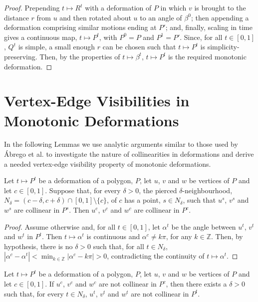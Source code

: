\documentclass{amsart}
\newcommand{\Z}[0]{\mathds{Z}}
\begin{document}
\begin{proof}
  Prepending $t\mapsto R^t$ with a deformation of $P$ in which $v$ is
  brought to the distance $r$ from $u$ and then rotated about $u$ to
  an angle of $\beta^0$; then appending a deformation comprising
  similar motions ending at $P'$; and, finally, scaling in time gives
  a continuous map, $t\mapsto P^t$, with $P^0 = P$ and $P^1 = P'$.
  Since, for all $t\in[0,1]$, $Q^t$ is simple, a small enough $r$ can
  be chosen such that $t\mapsto P^t$ is simplicity-preserving.  Then,
  by the properties of $t\mapsto \beta^t$, $t\mapsto P^t$ is the
  required monotonic deformation.
\end{proof}


\iffullversion

\section{Vertex-Edge Visibilities in Monotonic Deformations}

In the following Lemmas we use analytic arguments similar to those
used by {\'A}brego et al. \cite{Abrego11} to investigate the nature of
collinearities in deformations and derive a needed vertex-edge
visibility property of monotonic deformations.

\begin{lemma}
  Let $t\mapsto P^t$ be a deformation of a polygon, $P$, let $u$, $v$
  and $w$ be vertices of $P$ and let $c\in[0,1]$.  Suppose that, for
  every $\delta>0$, the pierced $\delta$-neighbourhood, $N_\delta =
  (c-\delta, c+\delta)\cap [0,1]\setminus \{c\}$, of $c$ has a point,
  $s\in N_\delta$, such that $u^s$, $v^s$ and $w^s$ are collinear in
  $P^s$.  Then $u^c$, $v^c$ and $w^c$ are collinear in $P^c$.
\end{lemma}
\begin{proof}
  Assume otherwise and, for all $t\in[0,1]$, let $\alpha^t$ be the
  angle between $u^t$, $v^t$ and $w^t$ in $P^t$.  Then $t\mapsto
  \alpha^t$ is continuous and $\alpha^c\neq k\pi$, for any $k\in\Z$.
  Then, by hypothesis, there is no $\delta>0$ such that, for all $t\in
  N_\delta$, $|\alpha^c - \alpha^t| < \min_{k\in\Z}|\alpha^c-k\pi| >
  0$, contradicting the continuity of $t\mapsto \alpha^t$.
\end{proof}

\begin{cor}
  Let $t\mapsto P^t$ be a deformation of a polygon, $P$, let $u$, $v$
  and $w$ be vertices of $P$ and let $c\in[0,1]$.  If $u^c$, $v^c$ and
  $w^c$ are not collinear in $P^c$, then there exists a $\delta>0$
  such that, for every $t\in N_\delta$, $u^t$, $v^t$ and $w^t$ are not
  collinear in $P^t$.
\end{cor}
\end{document}
